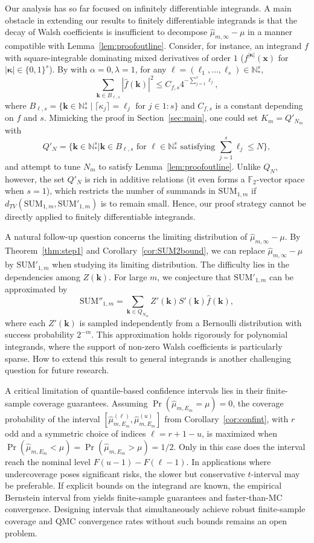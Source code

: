 \documentclass{article}
\theoremstyle{definition}
\renewcommand{\leq}{\leqslant}
\newcommand{\natu}{\mathbb{N}}
\newcommand{\bsk}{\boldsymbol{k}}
\newcommand{\bsx}{\boldsymbol{x}}
\newcommand{\bsell}{\boldsymbol{\ell}}
\newcommand{\bskappa}{\boldsymbol{\kappa}}
\begin{document}
Our analysis has so far focused on infinitely differentiable integrands. A main obstacle in extending our results to finitely differentiable integrands is that the decay of Walsh coefficients is insufficient to decompose $\hat{\mu}_{m,\infty}-\mu$ in a manner compatible with Lemma~\ref{lem:proofoutline}. Consider, for instance, an integrand $f$ with square-integrable dominating mixed derivatives of order $1$ ($f^{|\bskappa|}(\bsx)$ for $|\bskappa|\in \{0,1\}^s$). By \cite[Corollary 3]{pan2024automatic} with $\alpha=0,\lambda=1$, for any $\bsell=(\ell_1,\dots,\ell_s)\in \natu_*^s$,
$$\sum_{\bsk\in B_{\bsell,s}}|\hat{f}(\bsk)|^2\leq C_{f,s} 4^{-\sum_{j=1}^s\ell_j},$$
where $B_{\bsell,s}=\{\bsk\in\natu^s_*\mid \lceil \kappa_j\rceil=\ell_j \text{ for } j\in 1{:}s\}$ and $C_{f,s}$ is a constant depending on $f$ and $s$. Mimicking the proof in Section~\ref{sec:main}, one could set $K_m=Q'_{N_m}$ with
$$Q'_{N}=\Big\{\bsk\in\natu^s_*\Big\vert \bsk\in B_{\bsell,s}\text{ for } \bsell \in \natu_*^s \text{ satisfying } \sum_{j=1}^s\ell_j\leq N\Big\},$$
and attempt to tune $N_m$ to satisfy Lemma~\ref{lem:proofoutline}. Unlike $Q_N$, however, the set $Q'_{N}$ is rich in additive relations (it even forms a $\mathbb{F}_2$-vector space when $s=1$), which restricts the number of summands in $\mathrm{SUM}_{1,m}$ if $d_{TV}(\mathrm{SUM}_{1,m},\mathrm{SUM}'_{1,m})$ is to remain small. Hence, our proof strategy cannot be directly applied to finitely differentiable integrands.

A natural follow-up question concerns the limiting distribution of $\hat{\mu}_{m,\infty}-\mu$. By Theorem~\ref{thm:step1} and Corollary~\ref{cor:SUM2bound}, we can replace $\hat{\mu}_{m,\infty}-\mu$ by $\mathrm{SUM}'_{1,m}$ when studying its limiting distribution. The difficulty lies in the dependencies among $Z(\bsk)$. For large $m$, we conjecture that $\mathrm{SUM}'_{1,m}$ can be approximated by
$$\mathrm{SUM}''_{1,m}=\sum_{\bsk\in Q_{N_m}}Z'(\bsk)S'(\bsk)\hat{f}(\bsk),$$
where each $Z'(\bsk)$ is sampled independently from a Bernoulli distribution with success probability $2^{-m}$. This approximation holds rigorously for polynomial integrands, where the support of non-zero Walsh coefficients is particularly sparse. How to extend this result to general integrands is another challenging question for future research.

A critical limitation of quantile-based confidence intervals lies in their finite-sample coverage guarantees. Assuming $\Pr(\hat{\mu}_{m,E_m}=\mu)=0$, the coverage probability of the interval $[\hat{\mu}^{(\ell)}_{m,E_m},\hat{\mu}^{(u)}_{m,E_m}]$ from Corollary~\ref{cor:confint}, with $r$ odd and a symmetric choice of indices $\ell=r+1-u$, is maximized when $\Pr(\hat{\mu}_{m,E_m}<\mu)=\Pr(\hat{\mu}_{m,E_m}>\mu)=1/2$. Only in this case does the interval reach the nominal level $F(u-1)-F(\ell-1)$. In applications where undercoverage poses significant risks, the slower but conservative $t$-interval may be preferable. If explicit bounds on the integrand are known, the empirical Bernstein interval from \cite{jain2025empirical} yields finite-sample guarantees and faster-than-MC convergence. Designing intervals that simultaneously achieve robust finite-sample coverage and QMC convergence rates without such bounds remains an open problem.
\end{document}
